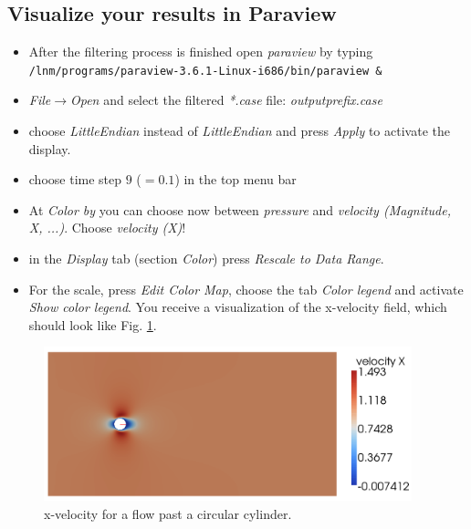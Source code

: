 \subsection{Visualize your results in Paraview}
\begin{itemize}
\item After the filtering process is finished open \emph{paraview} by typing \newline
\texttt{/lnm/programs/paraview-3.6.1-Linux-i686/bin/paraview \&}
\item \emph{File$\to$Open} and select the filtered \emph{*.case}
file: \emph{outputprefix.case}
\item choose \emph{LittleEndian} instead of \emph{LittleEndian} and press \emph{Apply} to activate the display.
\item choose time step $9$ ($=0.1$) in the top menu bar 
\item At \emph{Color by} you can choose now between \emph{pressure} and \emph{velocity (Magnitude, X, ...)}. Choose \emph{velocity (X)}!
\item in the \emph{Display} tab (section \emph{Color}) press \emph{Rescale to Data Range}. 
\item For the scale, press \emph{Edit Color Map}, choose the tab \emph{Color legend} and activate \emph{Show color legend}.
You receive a visualization of the x-velocity field, which should look like Fig. \ref{fig:FlowPastCylinder_x-velocity}.
\end{itemize}

\begin{figure}[H]
 \begin{center}
  \includegraphics[width=0.95\textwidth]{pics/tut_fluid_xvel.png}   
  \caption{x-velocity for a flow past a circular cylinder.}
  \label{fig:FlowPastCylinder_x-velocity}
\end{center}
\end{figure}
